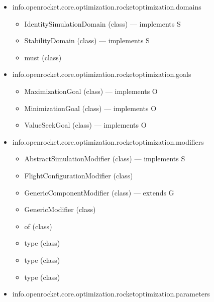 \documentclass{amsdtx}
\begin{document}
\begin{itemize}
\begin{itemize}
    \begin{itemize}
    
    \item
      OptimizableParameter (interface)
    \item
      OptimizationGoal (interface)
    \item
      RocketOptimizationFunction (class) --- implements F
    \item
      RocketOptimizationListener (interface)
    \item
      SimulationDomain (interface)
    \item
      SimulationModifier (interface) --- extends C
    \item
      defining (interface)
    \item
      must (class)
    \item
      what (interface)
    \end{itemize}
  \item
    info.openrocket.core.optimization.rocketoptimization.domains

    \begin{itemize}
    
    \item
      IdentitySimulationDomain (class) --- implements S
    \item
      StabilityDomain (class) --- implements S
    \item
      must (class)
    \end{itemize}
  \item
    info.openrocket.core.optimization.rocketoptimization.goals

    \begin{itemize}
    
    \item
      MaximizationGoal (class) --- implements O
    \item
      MinimizationGoal (class) --- implements O
    \item
      ValueSeekGoal (class) --- implements O
    \end{itemize}
  \item
    info.openrocket.core.optimization.rocketoptimization.modifiers

    \begin{itemize}
    
    \item
      AbstractSimulationModifier (class) --- implements S
    \item
      FlightConfigurationModifier (class)
    \item
      GenericComponentModifier (class) --- extends G
    \item
      GenericModifier (class)
    \item
      of (class)
    \item
      type (class)
    \item
      type (class)
    \item
      type (class)
    \end{itemize}
  \item
    info.openrocket.core.optimization.rocketoptimization.parameters


\end{itemize}
\end{itemize}
\end{document}

